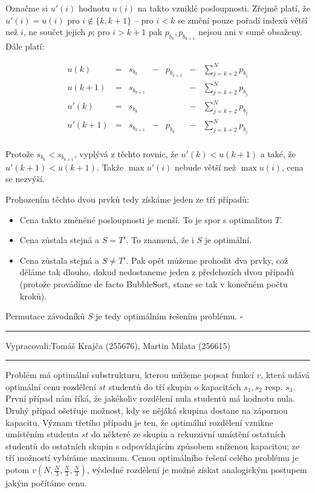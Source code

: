 \documentclass[12pt]{article}
\newcommand{\zadani}[2]{
{\large
\noindent {\bf IB108 \hfill{} Sada #1, Příklad #2 \\[-4mm]}
\noindent\hrule
\vspace{2mm}
\noindent Vypracovali:\hfill{}Tomáš Krajča (255676), Martin Milata (256615)
\vspace{3mm}
\hrule
\bigskip\bigskip}
}
\begin{document}
Označme si $u'(i)$ hodnotu $u(i)$ na takto vzniklé posloupnosti. Zřejmě platí, že $u'(i) = u(i)$ pro
$i \notin \{k, k+1\}$ -- pro $i < k$ se změní pouze pořadí indexů větší než $i$, ne součet jejich
$p$; pro $i > k+1$ pak $p_{b_k}, p_{b_{k+1}}$ nejsou ani v sumě obsaženy. Dále platí:

$$
\begin{array}{rclclcl}
u(k)    & = & s_{b_k}     & - & p_{b_{k+1}} & - & \sum_{j=k+2}^N p_{b_j} \\
u(k+1)  & = & s_{b_{k+1}} &   &             & - & \sum_{j=k+2}^N p_{b_j} \\
u'(k)   & = & s_{b_k}     &   &             & - & \sum_{j=k+2}^N p_{b_j} \\
u'(k+1) & = & s_{b_{k+1}} & - & p_{b_k}     & - & \sum_{j=k+2}^N p_{b_j} \\
\end{array}
$$

\noindent
Protože $s_{b_k} < s_{b_{k+1}}$, vyplývá z těchto rovnic, že $u'(k) < u(k+1)$ a také, že $u'(k+1) <
u(k+1)$. Takže $\max u'(i)$ nebude větší než $\max u(i)$, cena se nezvýší.

\medskip
\noindent
Prohozením těchto dvou prvků tedy získáme jeden ze tří případů:

\begin{itemize}
\item Cena takto změněné posloupnosti je menší. To je spor s optimalitou $T$.
\item Cena zůstala stejná a $S = T'$. To znamená, že i $S$ je optimální.
\item Cena zůstala stejná a $S \neq T'$. Pak opět můžeme prohodit dva prvky, což děláme tak dlouho,
      dokud nedostaneme jeden z předchozích dvou případů (protože provádíme de facto BubbleSort,
      stane se tak v konečném počtu kroků).
\end{itemize}

\noindent
Permutace závodníků $S$ je tedy optimálním řešením problému.
\hfill$\square$

\clearpage
\zadani{2}{3}

\noindent
Problém má optimální substrukturu, kterou můžeme popsat funkcí $v$, která udává optimální cenu
rozdělení $st$ studentů do tří skupin o kapacitách $s_1, s_2$ resp. $s_3$. První případ nám říká, že
jakékoliv rozdělení nula studentů má hodnotu nula. Druhý případ ošetřuje možnost, kdy se nějáká
skupina dostane na zápornou kapacitu. Význam třetího případu je ten, že optimální rozdělení vznikne
umístěním studenta $st$ do některé ze skupin a rekurzivní umístění ostatních studentů do ostatních
skupin s odpovídajícím způsobem sníženou kapacitou; ze tří možností vybíráme maximum. Cenou
optimálního řešení celého problému je potom $v\left(N,\frac{N}{3},\frac{N}{3},\frac{N}{3}\right)$,
výsledné rozdělení je možné získat analogickým postupem jakým počítáme cenu.
\end{document}
